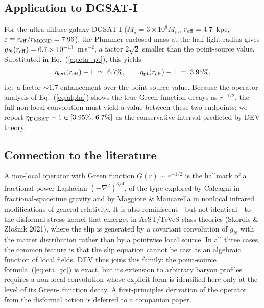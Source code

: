 \subsection{Application to DGSAT-I}

For the ultra-diffuse galaxy DGSAT-I ($M_\star=3\times10^{8}M_\odot$,
$r_{\rm eff}=4.7$~kpc, $\varepsilon\equiv r_{\rm eff}/r_{\rm
MOND}=7.96$), the Plummer enclosed mass at the half-light radius
gives $g_N(r_{\rm eff})=6.7\times10^{-13}$~m\,s$^{-2}$, a factor
$2\sqrt{2}$ smaller than the point-source value.  Substituted in
Eq.~(\ref{eq:eta_pt}), this yields
\begin{equation}
\eta_{\rm ext}(r_{\rm eff})-1 \;\simeq\; 6.7\%,\qquad
\eta_{\rm pt}(r_{\rm eff})-1 \;=\; 3.95\%,
\label{eq:dgsat_eta}
\end{equation}
i.e.\ a factor $\sim\!1.7$ enhancement over the point-source value.
Because the operator analysis of Eq.~(\ref{eq:alpha}) shows the true
Green function decays as $r^{-1/2}$, the full non-local convolution
must yield a value between these two endpoints; we report
$\eta_{\rm DGSAT}-1\in[3.95\%,\,6.7\%]$ as the conservative interval
predicted by DEV theory.

\subsection{Connection to the literature}

A non-local operator with Green function $G(r)\sim r^{-1/2}$ is the
hallmark of a fractional-power Laplacian $(-\nabla^2)^{3/4}$, of the
type explored by Calcagni in fractional-spacetime gravity and by
Maggiore \& Mancarella in nonlocal infrared modifications of general
relativity.  It is also reminiscent---but not identical---to the
disformal-stress kernel that emerges in AeST/TeVeS-class theories
(Skordis \& Z\l{}o\'snik 2021), where the slip is generated by a
covariant convolution of $g_N$ with the matter distribution rather
than by a pointwise local source.  In all three cases, the common
feature is that the slip equation cannot be cast as an algebraic
function of local fields.  DEV thus joins this family: the
point-source formula~(\ref{eq:eta_pt}) is exact, but its extension to
arbitrary baryon profiles requires a non-local convolution whose
explicit form is identified here only at the level of its Green-%
function decay.  A first-principles derivation of the operator from
the disformal action is deferred to a companion paper.
